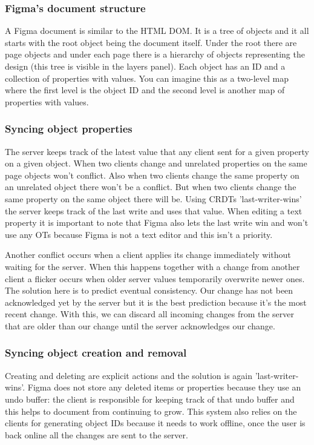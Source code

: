 \subsubsection*{Figma's document structure}

A Figma document is similar to the HTML DOM. It is a tree of objects and it all starts with the root object being the document itself. Under the root there are page objects and under each page there is a hierarchy of objects representing the design (this tree is visible in the layers panel). Each object has an ID and a collection of properties with values. You can imagine this as a two-level map where the first level is the object ID and the second level is another map of properties with values. \cite{figma-rtc}

\subsubsection*{Syncing object properties}

The server keeps track of the latest value that any client sent for a given property on a given object. When two clients change and unrelated properties on the same page objects won't conflict. Also when two clients change the same property on an unrelated object there won't be a conflict. But when two clients change the same property on the same object there will be. Using CRDTs 'last-writer-wins' the server keeps track of the last write and uses that value. When editing a text property it is important to note that Figma also lets the last write win and won't use any OTs because Figma is not a text editor and this isn't a priority.

Another conflict occurs when a client applies its change immediately without waiting for the server. When this happens together with a change from another client a flicker occurs when older server values temporarily overwrite newer ones. The solution here is to predict eventual consistency. Our change has not been acknowledged yet by the server but it is the best prediction because it's the most recent change. With this, we can discard all incoming changes from the server that are older than our change until the server acknowledges our change. \cite{figma-rtc}

\subsubsection*{Syncing object creation and removal}

Creating and deleting are explicit actions and the solution is again 'last-writer-wins'. Figma does not store any deleted items or properties because they use an undo buffer: the client is responsible for keeping track of that undo buffer and this helps to document from continuing to grow. This system also relies on the clients for generating object IDs because it needs to work offline, once the user is back online all the changes are sent to the server. \cite{figma-rtc}

